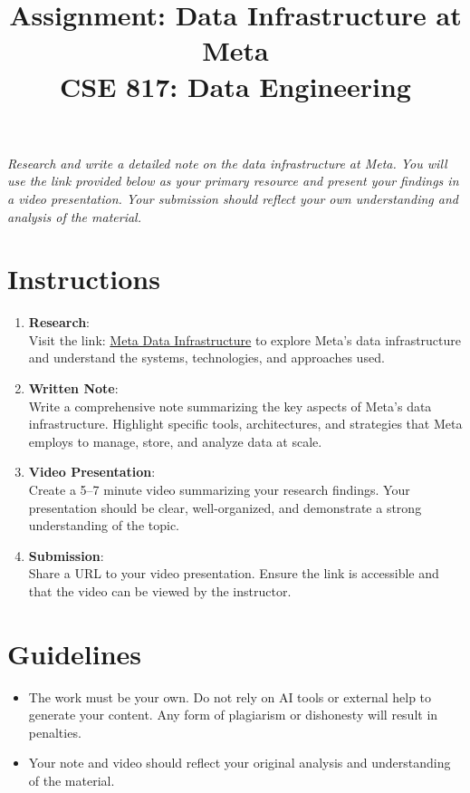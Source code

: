 \documentclass[12pt,platino]{article}
\title{Assignment: Data Infrastructure at Meta \\ CSE 817: Data Engineering}
\date{}
\begin{document}
	
	\maketitle
	
 
\textit{  Research and write a detailed note on the data infrastructure at Meta. You will use the link provided below as your primary resource and present your findings in a video presentation. Your submission should reflect your own understanding and analysis of the material.}
	
	\section*{Instructions}
	\begin{enumerate}
		\item \textbf{Research}: \\
		Visit the link: \href{https://engineering.fb.com/category/data-infrastructure/}{Meta Data Infrastructure} to explore Meta’s data infrastructure and understand the systems, technologies, and approaches used.
		
		\item \textbf{Written Note}: \\
		Write a comprehensive note summarizing the key aspects of Meta’s data infrastructure. Highlight specific tools, architectures, and strategies that Meta employs to manage, store, and analyze data at scale.
		
		\item \textbf{Video Presentation}: \\
		Create a 5–7 minute video summarizing your research findings. Your presentation should be clear, well-organized, and demonstrate a strong understanding of the topic.
		
		\item \textbf{Submission}: \\
		Share a URL to your video presentation. Ensure the link is accessible and that the video can be viewed by the instructor.
	\end{enumerate}
	
	\section*{Guidelines}
	\begin{itemize}
		\item The work must be your own. Do not rely on AI tools or external help to generate your content. Any form of plagiarism or dishonesty will result in penalties.
		\item Your note and video should reflect your original analysis and understanding of the material.
	\end{itemize}
	
 
\end{document}
